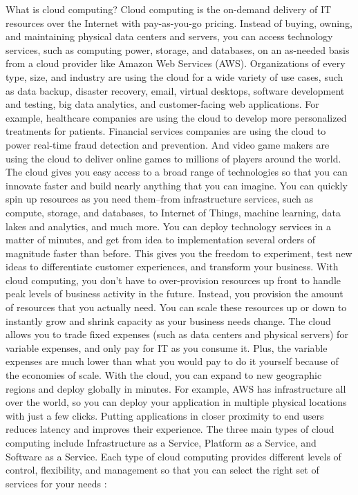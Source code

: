 What is cloud computing? Cloud computing is the on-demand delivery of IT resources over the Internet with pay-as-you-go pricing. Instead of buying, owning, and maintaining physical data centers and servers, you can access technology services, such as computing power, storage, and databases, on an as-needed basis from a cloud provider like Amazon Web Services (AWS). Organizations of every type, size, and industry are using the cloud for a wide variety of use cases, such as data backup, disaster recovery, email, virtual desktops, software development and testing, big data analytics, and customer-facing web applications. For example, healthcare companies are using the cloud to develop more personalized treatments for patients. Financial services companies are using the cloud to power real-time fraud detection and prevention. And video game makers are using the cloud to deliver online games to millions of players around the world. 
The cloud gives you easy access to a broad range of technologies so that you can innovate faster and build nearly anything that you can imagine. You can quickly spin up resources as you need them–from infrastructure services, such as compute, storage, and databases, to Internet of Things, machine learning, data lakes and analytics, and much more. You can deploy technology services in a matter of minutes, and get from idea to implementation several orders of magnitude faster than before. This gives you the freedom to experiment, test new ideas to differentiate customer experiences, and transform your business.
With cloud computing, you don't have to over-provision resources up front to handle peak levels of business activity in the future. Instead, you provision the amount of resources that you actually need. You can scale these resources up or down to instantly grow and shrink capacity as your business needs change.
The cloud allows you to trade fixed expenses (such as data centers and physical servers) for variable expenses, and only pay for IT as you consume it. Plus, the variable expenses are much lower than what you would pay to do it yourself because of the economies of scale. 
With the cloud, you can expand to new geographic regions and deploy globally in minutes. For example, AWS has infrastructure all over the world, so you can deploy your application in multiple physical locations with just a few clicks. Putting applications in closer proximity to end users reduces latency and improves their experience. 
The three main types of cloud computing include Infrastructure as a Service, Platform as a Service, and Software as a Service. Each type of cloud computing provides different levels of control, flexibility, and management so that you can select the right set of services for your needs \cite{AWSWhatIsCloudComputing}:
